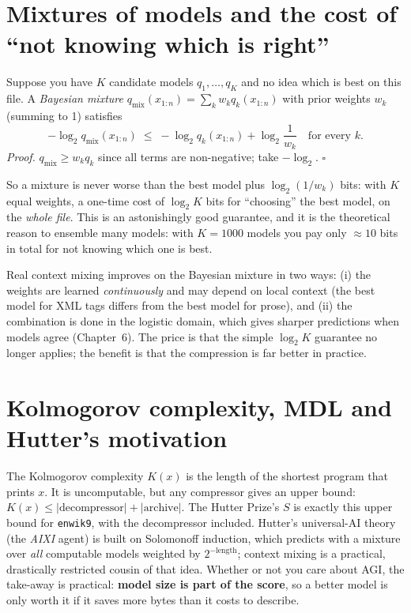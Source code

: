 \documentclass[11pt,a4paper,openany]{book}
\newcommand{\code}[1]{\texttt{#1}}
\theoremstyle{definition}
\theoremstyle{remark}
\begin{document}
\section{Mixtures of models and the cost of ``not knowing which is right''}

Suppose you have $K$ candidate models $q_1,\dots,q_K$ and no idea which is best on this file. A \emph{Bayesian mixture} $q_{\text{mix}}(x_{1:n})=\sum_k w_k q_k(x_{1:n})$ with prior weights $w_k$ (summing to 1) satisfies
\[
-\log_2 q_{\text{mix}}(x_{1:n}) \;\le\; -\log_2 q_k(x_{1:n}) + \log_2\frac1{w_k}\quad\text{for every }k.
\]
\emph{Proof.} $q_{\text{mix}}\ge w_kq_k$ since all terms are non-negative; take $-\log_2$. $\square$

So a mixture is never worse than the best model plus $\log_2(1/w_k)$ bits: with $K$ equal weights, a one-time cost of $\log_2K$ bits for ``choosing'' the best model, on the \emph{whole file}. This is an astonishingly good guarantee, and it is the theoretical reason to ensemble many models: with $K=1000$ models you pay only $\approx 10$ bits in total for not knowing which one is best.

\begin{keyidea}
Real context mixing improves on the Bayesian mixture in two ways: (i) the weights are learned \emph{continuously} and may depend on local context (the best model for XML tags differs from the best model for prose), and (ii) the combination is done in the logistic domain, which gives sharper predictions when models agree (Chapter~6). The price is that the simple $\log_2 K$ guarantee no longer applies; the benefit is that the compression is far better in practice.
\end{keyidea}

\section{Kolmogorov complexity, MDL and Hutter's motivation}

The Kolmogorov complexity $K(x)$ is the length of the shortest program that prints $x$. It is uncomputable, but any compressor gives an upper bound: $K(x)\le |\text{decompressor}|+|\text{archive}|$. The Hutter Prize's $S$ is exactly this upper bound for \code{enwik9}, with the decompressor included. Hutter's universal-AI theory (the \emph{AIXI} agent) is built on Solomonoff induction, which predicts with a mixture over \emph{all} computable models weighted by $2^{-\text{length}}$; context mixing is a practical, drastically restricted cousin of that idea. Whether or not you care about AGI, the take-away is practical: \textbf{model size is part of the score}, so a better model is only worth it if it saves more bytes than it costs to describe.
\end{document}
